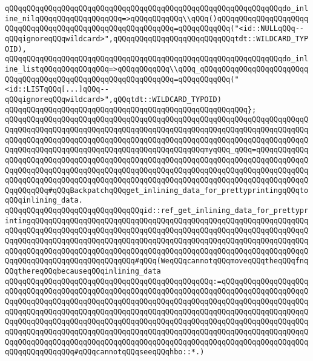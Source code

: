 \verb|qQQqqQQqqQQqqQQqqQQqqQQqqQQqqQQqqQQqqQQqqQQqqQQqqQQqqQQqqQQqqQQqdo_inline_nilqQQqqQQqqQQqqQQqqQQq=>qQQqqQQqqQQq\\qQQq()qQQqqQQqqQQqqQQqqQQqqQQqqQQqqQQqqQQqqQQqqQQqqQQqqQQqqQQqqQQq=qQQqqQQqqQQq("<id::NULLqQQq--qQQqignoreqQQqwildcard>",qQQqqQQqqQQqqQQqqQQqqQQqqQQqtdt::WILDCARD_TYPOID),|\newline
\verb|qQQqqQQqqQQqqQQqqQQqqQQqqQQqqQQqqQQqqQQqqQQqqQQqqQQqqQQqqQQqqQQqdo_inline_listqQQqqQQqqQQqqQQq=>qQQqqQQqqQQq\\qQQq_qQQqqQQqqQQqqQQqqQQqqQQqqQQqqQQqqQQqqQQqqQQqqQQqqQQqqQQqqQQqqQQq=qQQqqQQqqQQq("<id::LISTqQQq[...]qQQq--qQQqignoreqQQqwildcard>",qQQqtdt::WILDCARD_TYPOID)|\newline
\verb|qQQqqQQqqQQqqQQqqQQqqQQqqQQqqQQqqQQqqQQqqQQqqQQqqQQqqQQq};|\newline
\newline
\verb|qQQqqQQqqQQqqQQqqQQqqQQqqQQqqQQqqQQqqQQqqQQqqQQqqQQqqQQqqQQqqQQqqQQqqQQqqQQqqQQqqQQqqQQqqQQqqQQqqQQqqQQqqQQqqQQqqQQqqQQqqQQqqQQqqQQqqQQqqQQqqQQqqQQqqQQqqQQqqQQqqQQqqQQqqQQqqQQqqQQqqQQqqQQqqQQqqQQqqQQqqQQqqQQqqQQqqQQqqQQqqQQqqQQqqQQqqQQqqQQqqQQqqQQqqQQqqQQqmyqQQq_qQQq=qQQqqQQqqQQqqQQqqQQqqQQqqQQqqQQqqQQqqQQqqQQqqQQqqQQqqQQqqQQqqQQqqQQqqQQqqQQqqQQqqQQqqQQqqQQqqQQqqQQqqQQqqQQqqQQqqQQqqQQqqQQqqQQqqQQqqQQqqQQqqQQqqQQqqQQqqQQqqQQqqQQqqQQqqQQqqQQqqQQqqQQqqQQqqQQqqQQqqQQqqQQqqQQqqQQqqQQqqQQqqQQqqQQqqQQq#qQQqBackpatchqQQqget_inlining_data_for_prettyprintingqQQqtoqQQqinlining_data.|\newline
\verb|qQQqqQQqqQQqqQQqqQQqqQQqqQQqqQQqid::ref_get_inlining_data_for_prettyprintingqQQqqQQqqQQqqQQqqQQqqQQqqQQqqQQqqQQqqQQqqQQqqQQqqQQqqQQqqQQqqQQqqQQqqQQqqQQqqQQqqQQqqQQqqQQqqQQqqQQqqQQqqQQqqQQqqQQqqQQqqQQqqQQqqQQqqQQqqQQqqQQqqQQqqQQqqQQqqQQqqQQqqQQqqQQqqQQqqQQqqQQqqQQqqQQqqQQqqQQqqQQqqQQqqQQqqQQqqQQqqQQqqQQqqQQqqQQqqQQqqQQqqQQqqQQqqQQqqQQqqQQqqQQqqQQqqQQqqQQqqQQqqQQqqQQqqQQqqQQqqQQq#qQQq(WeqQQqcannotqQQqmoveqQQqtheqQQqfnqQQqthereqQQqbecauseqQQqinlining_data|\newline
\verb|qQQqqQQqqQQqqQQqqQQqqQQqqQQqqQQqqQQqqQQqqQQqqQQq:=qQQqqQQqqQQqqQQqqQQqqQQqqQQqqQQqqQQqqQQqqQQqqQQqqQQqqQQqqQQqqQQqqQQqqQQqqQQqqQQqqQQqqQQqqQQqqQQqqQQqqQQqqQQqqQQqqQQqqQQqqQQqqQQqqQQqqQQqqQQqqQQqqQQqqQQqqQQqqQQqqQQqqQQqqQQqqQQqqQQqqQQqqQQqqQQqqQQqqQQqqQQqqQQqqQQqqQQqqQQqqQQqqQQqqQQqqQQqqQQqqQQqqQQqqQQqqQQqqQQqqQQqqQQqqQQqqQQqqQQqqQQqqQQqqQQqqQQqqQQqqQQqqQQqqQQqqQQqqQQqqQQqqQQqqQQqqQQqqQQqqQQqqQQqqQQqqQQqqQQqqQQqqQQqqQQqqQQqqQQqqQQqqQQqqQQqqQQqqQQqqQQqqQQqqQQqqQQqqQQqqQQqqQQqqQQqqQQqqQQqqQQqqQQqqQQqqQQq#qQQqcannotqQQqseeqQQqhbo::*.)|\newline
